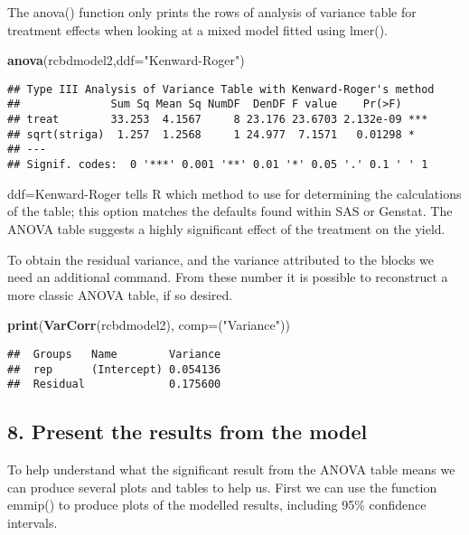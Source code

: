 \documentclass[]{book}
\newenvironment{Shaded}{\begin{snugshade}}{\end{snugshade}}
\newcommand{\KeywordTok}[1]{\textcolor[rgb]{0.13,0.29,0.53}{\textbf{#1}}}
\newcommand{\DataTypeTok}[1]{\textcolor[rgb]{0.13,0.29,0.53}{#1}}
\newcommand{\StringTok}[1]{\textcolor[rgb]{0.31,0.60,0.02}{#1}}
\newcommand{\NormalTok}[1]{#1}
\theoremstyle{definition}
\theoremstyle{definition}
\theoremstyle{definition}
\theoremstyle{remark}
\begin{document}
The anova() function only prints the rows of analysis of variance table
for treatment effects when looking at a mixed model fitted using lmer().

\begin{Shaded}
\begin{Highlighting}[]
\KeywordTok{anova}\NormalTok{(rcbdmodel2,}\DataTypeTok{ddf=}\StringTok{"Kenward-Roger"}\NormalTok{)}
\end{Highlighting}
\end{Shaded}

\begin{verbatim}
## Type III Analysis of Variance Table with Kenward-Roger's method
##              Sum Sq Mean Sq NumDF  DenDF F value    Pr(>F)    
## treat        33.253  4.1567     8 23.176 23.6703 2.132e-09 ***
## sqrt(striga)  1.257  1.2568     1 24.977  7.1571   0.01298 *  
## ---
## Signif. codes:  0 '***' 0.001 '**' 0.01 '*' 0.05 '.' 0.1 ' ' 1
\end{verbatim}

ddf=Kenward-Roger tells R which method to use for determining the
calculations of the table; this option matches the defaults found within
SAS or Genstat. The ANOVA table suggests a highly significant effect of
the treatment on the yield.

To obtain the residual variance, and the variance attributed to the
blocks we need an additional command. From these number it is possible
to reconstruct a more classic ANOVA table, if so desired.

\begin{Shaded}
\begin{Highlighting}[]
\KeywordTok{print}\NormalTok{(}\KeywordTok{VarCorr}\NormalTok{(rcbdmodel2), }\DataTypeTok{comp=}\NormalTok{(}\StringTok{"Variance"}\NormalTok{))}
\end{Highlighting}
\end{Shaded}

\begin{verbatim}
##  Groups   Name        Variance
##  rep      (Intercept) 0.054136
##  Residual             0.175600
\end{verbatim}

\subsection{8. Present the results from the
model}\label{present-the-results-from-the-model-2}

To help understand what the significant result from the ANOVA table
means we can produce several plots and tables to help us. First we can
use the function emmip() to produce plots of the modelled results,
including 95\% confidence intervals.
\end{document}
